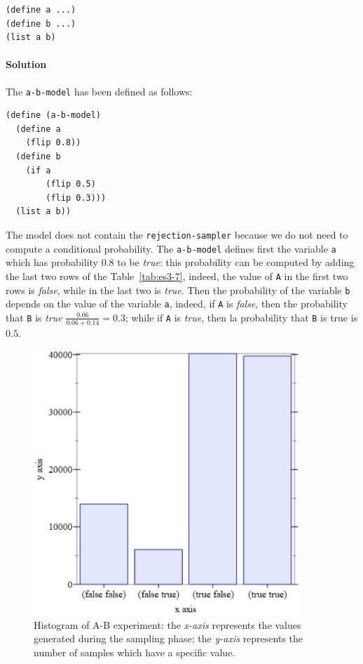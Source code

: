 \begin{lstlisting}
(define a ...)
(define b ...)
(list a b)
\end{lstlisting}

\paragraph{Solution}
The \texttt{a-b-model} has been defined as follows:
\begin{lstlisting}[caption={Model to compute the probabilities of A and B}, captionpos=b]
(define (a-b-model)
  (define a
    (flip 0.8))
  (define b
    (if a
        (flip 0.5)
        (flip 0.3)))
  (list a b))
\end{lstlisting}
The model does not contain the \texttt{rejection-sampler} because we do not need to compute a conditional probability.
The \texttt{a-b-model} defines first the variable \texttt{a} which has probability $0.8$ to be \textit{true}:
this probability can be computed by adding the last two rows of the Table~\ref{tab:es3-7}, indeed, the value of \texttt{A} in
the first two rows is \textit{false}, while in the last two is \textit{true}.
Then the probability of the variable \texttt{b} depends on the value of the variable \texttt{a}, indeed, if \texttt{A} is 
\textit{false}, then the probability that \texttt{B} is \textit{true} $ \frac{0.06}{0.06 + 0.14} = 0.3 $; while if
\texttt{A} is \textit{true}, then la probability that \texttt{B} is true is $ 0.5 $.

\begin{figure}[h]
    \centering
    \includegraphics[width=10cm]{images/3.7.png}
    \caption{
        Histogram of A-B experiment: the \textit{x-axis} represents the values generated during the sampling phase; 
        the \textit{y-axis} represents the number of samples which have a specific value.
    }
    \label{fig:3-7}
\end{figure}

